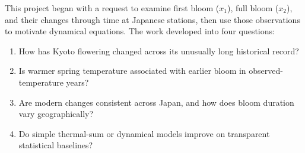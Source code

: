 \documentclass[11pt,a4paper]{article}
\begin{document}
This project began with a request to examine first bloom ($x_1$), full bloom ($x_2$), and their changes through time at Japanese stations, then use those observations to motivate dynamical equations. The work developed into four questions:
\begin{enumerate}
  \item How has Kyoto flowering changed across its unusually long historical record?
  \item Is warmer spring temperature associated with earlier bloom in observed-temperature years?
  \item Are modern changes consistent across Japan, and how does bloom duration vary geographically?
  \item Do simple thermal-sum or dynamical models improve on transparent statistical baselines?
\end{enumerate}




\end{document}

